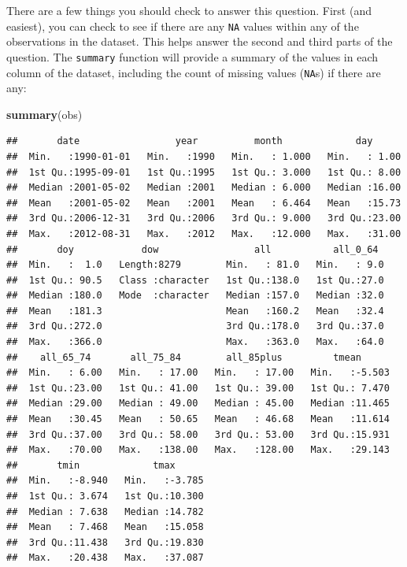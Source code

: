 \documentclass[
]{book}
\newenvironment{Shaded}{\begin{snugshade}}{\end{snugshade}}
\newcommand{\FunctionTok}[1]{\textcolor[rgb]{0.13,0.29,0.53}{\textbf{#1}}}
\newcommand{\NormalTok}[1]{#1}
\begin{document}
There are a few things you should check to answer this question. First
(and easiest), you can check to see if there are any \texttt{NA} values within
any of the observations in the dataset. This helps answer the second and third
parts of the question. The \texttt{summary} function will provide
a summary of the values in each column of the dataset, including the count
of missing values (\texttt{NA}s) if there are any:

\begin{Shaded}
\begin{Highlighting}[]
\FunctionTok{summary}\NormalTok{(obs)}
\end{Highlighting}
\end{Shaded}

\begin{verbatim}
##       date                 year          month             day       
##  Min.   :1990-01-01   Min.   :1990   Min.   : 1.000   Min.   : 1.00  
##  1st Qu.:1995-09-01   1st Qu.:1995   1st Qu.: 3.000   1st Qu.: 8.00  
##  Median :2001-05-02   Median :2001   Median : 6.000   Median :16.00  
##  Mean   :2001-05-02   Mean   :2001   Mean   : 6.464   Mean   :15.73  
##  3rd Qu.:2006-12-31   3rd Qu.:2006   3rd Qu.: 9.000   3rd Qu.:23.00  
##  Max.   :2012-08-31   Max.   :2012   Max.   :12.000   Max.   :31.00  
##       doy            dow                 all           all_0_64   
##  Min.   :  1.0   Length:8279        Min.   : 81.0   Min.   : 9.0  
##  1st Qu.: 90.5   Class :character   1st Qu.:138.0   1st Qu.:27.0  
##  Median :180.0   Mode  :character   Median :157.0   Median :32.0  
##  Mean   :181.3                      Mean   :160.2   Mean   :32.4  
##  3rd Qu.:272.0                      3rd Qu.:178.0   3rd Qu.:37.0  
##  Max.   :366.0                      Max.   :363.0   Max.   :64.0  
##    all_65_74       all_75_84        all_85plus         tmean       
##  Min.   : 6.00   Min.   : 17.00   Min.   : 17.00   Min.   :-5.503  
##  1st Qu.:23.00   1st Qu.: 41.00   1st Qu.: 39.00   1st Qu.: 7.470  
##  Median :29.00   Median : 49.00   Median : 45.00   Median :11.465  
##  Mean   :30.45   Mean   : 50.65   Mean   : 46.68   Mean   :11.614  
##  3rd Qu.:37.00   3rd Qu.: 58.00   3rd Qu.: 53.00   3rd Qu.:15.931  
##  Max.   :70.00   Max.   :138.00   Max.   :128.00   Max.   :29.143  
##       tmin             tmax       
##  Min.   :-8.940   Min.   :-3.785  
##  1st Qu.: 3.674   1st Qu.:10.300  
##  Median : 7.638   Median :14.782  
##  Mean   : 7.468   Mean   :15.058  
##  3rd Qu.:11.438   3rd Qu.:19.830  
##  Max.   :20.438   Max.   :37.087
\end{verbatim}
\end{document}
